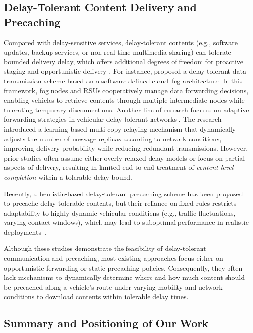 \subsection{Delay-Tolerant Content Delivery and Precaching}
\label{subsec:rw_dtc}
Compared with delay-sensitive services\cite{DSP1}, delay-tolerant contents (e.g., software updates, backup services, or non-real-time multimedia sharing) can tolerate bounded delivery delay, which offers additional degrees of freedom for proactive staging and opportunistic delivery \cite{DelayTolerantCloudFog, AdaptiveMultiCopyRelaying}. 
For instance, \cite{DelayTolerantCloudFog} proposed a delay-tolerant data transmission scheme based on a software-defined cloud–fog architecture. 
In this framework, fog nodes and RSUs cooperatively manage data forwarding decisions, enabling vehicles to retrieve contents through multiple intermediate nodes while tolerating temporary disconnections.
Another line of research focuses on adaptive forwarding strategies in vehicular delay-tolerant networks \cite{AdaptiveMultiCopyRelaying}. The research introduced a learning-based multi-copy relaying mechanism that dynamically adjusts the number of message replicas according to network conditions, improving delivery probability while reducing redundant transmissions.
However, prior studies often assume either overly relaxed delay models or focus on partial aspects of delivery, resulting in limited end-to-end treatment of \emph{content-level completion} within a tolerable delay bound. 


Recently, a heuristic-based delay-tolerant precaching scheme has been proposed to precache delay tolerable contents, but their reliance on fixed rules restricts adaptability to highly dynamic vehicular conditions (e.g., traffic fluctuations, varying contact windows), which may lead to suboptimal performance in realistic deployments~\cite{Nam}. 


Although these studies demonstrate the feasibility of delay-tolerant communication and precaching, most existing approaches focus either on opportunistic forwarding or static precaching policies. 
Consequently, they often lack mechanisms to dynamically determine where and how much content should be precached along a vehicle's route under varying mobility and network conditions to download contents within tolerable delay times.


\subsection{Summary and Positioning of Our Work}
\label{subsec:rw_summary}

